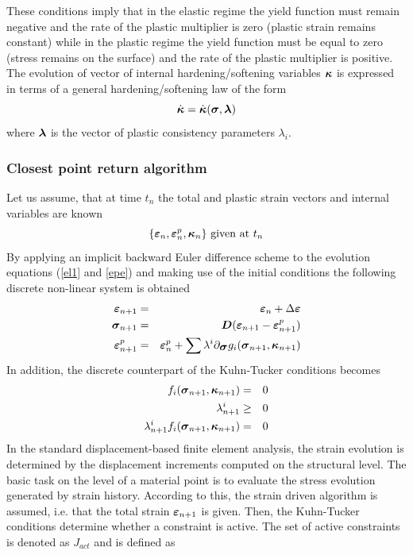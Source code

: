 \documentclass[epsf,a4paper]{article}
\newcommand{\mbf}[1]{\mbox{\boldmath$#1$}}
\newcommand{\ep}[0]{\mbf{\varepsilon}^p}
\newcommand{\e}{\mbf{\varepsilon}}
\newcommand{\sig}{\mbf{\sigma}}
\begin{document}
These conditions imply  that in the elastic regime the yield function must remain negative and the rate of the plastic multiplier is zero (plastic strain remains constant) while in the plastic regime the yield function must be equal to zero (stress remains on the surface) and the rate of the plastic multiplier is positive.
The evolution of vector of internal hardening/softening variables $\mbf{\kappa}$  is expressed in terms of a general 
hardening/softening law of the form
\begin{equation}
\dot{\mbf{\kappa}} = \dot{\mbf{\kappa}}(\sig, \mbf{\lambda})
\end{equation}
where $\mbf{\lambda}$ is the vector of plastic consistency parameters $\lambda_i$.

\subsubsection{Closest point return algorithm}
Let us assume, that at time $t_n$ the total and plastic strain vectors and internal variables are known
$$
\{\mbf{\varepsilon}_n, \mbf{\varepsilon}^p_n, \mbf{\kappa}_n\}\  {\rm given\ at}\ t_n
$$
By applying an implicit backward Euler difference scheme to the evolution equations (\ref{el1} and \ref{epe}) 
and making use of the initial conditions the following discrete non-linear system is obtained
\begin{eqnarray}
\e_{n+1}&=&\e_n+\Delta\e\\
\label{del}
\sig_{n+1}&=&\mbf{D}(\e_{n+1}-\ep_{n+1})\\
\label{dep}
\ep_{n+1}&=&\ep_{n}+\sum\lambda^i\partial_{\sig} g_i(\sig_{n+1}, \mbf{\kappa}_{n+1})
\end{eqnarray}
In addition, the discrete counterpart of the Kuhn-Tucker conditions becomes
\begin{eqnarray}
\label{dktc}
f_i(\sig_{n+1}, \mbf{\kappa}_{n+1}) &=& 0\\
\lambda^i_{n+1} &\ge& 0\\ 
\lambda^i_{n+1} f_i(\sig_{n+1}, \mbf{\kappa}_{n+1})&=& 0
\end{eqnarray}
In the standard displacement-based finite element analysis, the strain evolution is determined by the displacement increments computed on the structural level. The basic task on the level of a material point is to evaluate the stress evolution generated by strain history. 
According to this, the strain driven algorithm is assumed, i.e. that the total strain $\e_{n+1}$ is given. 
Then, the Kuhn-Tucker conditions determine whether a constraint is active. The set of active constraints is denoted as $J_{act}$ and is defined as
\end{document}
